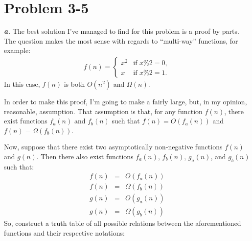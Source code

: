 \documentclass{article}
\begin{document}
\section*{Problem 3-5}

\noindent\textbf{\textit{a.}} The best solution I've managed to find for this problem is a proof by parts. The question makes the most sense with regards to ``multi-way'' functions, for example:
\begin{eqnarray*}
	f(n) =
	\begin{cases}
		x^2 & \text{if } x \% 2 = 0,\\
		x & \text{if } x \%2 = 1.
	\end{cases}
\end{eqnarray*}
In this case, $f(n)$ is both $O(n^2)$ and $\Omega(n)$.

In order to make this proof, I'm going to make a fairly large, but, in my opinion, reasonable, assumption. That assumption is that, for any function $f(n)$, there exist functions $f_a(n)$ and $f_b(n)$ such that $f(n) = O(f_a(n))$ and $f(n) = \Omega(f_b(n))$.

Now, suppose that there exist two asymptotically non-negative functions $f(n)$ and $g(n)$. Then there also exist functions $f_a(n)$, $f_b(n)$, $g_a(n)$, and $g_b(n)$ such that:
\begin{eqnarray*}
	f(n) & = & O(f_a(n)) \\
	f(n) & = & \Omega(f_b(n)) \\
	g(n) & = & O(g_a(n)) \\
	g(n) & = & \Omega(g_b(n))
\end{eqnarray*}
So, construct a truth table of all possible relations between the aforementioned functions and their respective notations:
\end{document}
